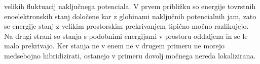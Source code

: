 velikih fluktuacij naključnega potenciala. V prvem približku so energije tovrstnih enoelektronskih stanj določene kar z globinami naključnih potencialnih jam,
 zato se energije stanj z velikim prostorskim prekrivanjem tipično močno razlikujejo. Na drugi strani so stanja s podobnimi energijami v prostoru oddaljena in se le malo prekrivajo. Ker stanja ne v enem ne v drugem primeru ne morejo medsebojno hibridizirati, ostanejo v primeru dovolj močnega nereda lokalizirana. \\\\



